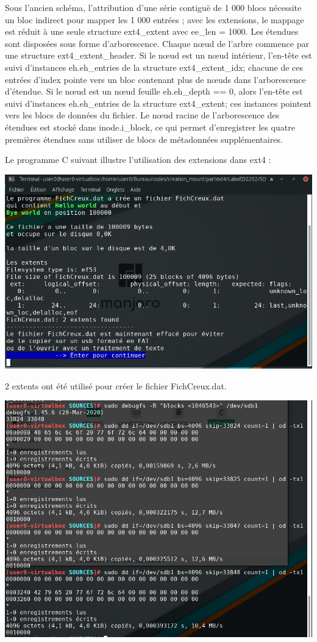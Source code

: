 \documentclass[12pt, letterpaper]{report}
\begin{document}
Sous l'ancien schéma, l'attribution d'une série contiguë de 1 000 blocs nécessite un bloc indirect pour mapper les 1 000 entrées ; avec les extensions, le mappage est réduit à une seule structure ext4\_extent avec ee\_len = 1000. Les étendues sont disposées sous forme d'arborescence. Chaque nœud de l'arbre commence par une structure ext4\_extent\_header. Si le nœud est un nœud intérieur, l'en-tête est suivi d'instances eh.eh\_entries de la structure ext4\_extent\_idx; chacune de ces entrées d'index pointe vers un bloc contenant plus de nœuds dans l'arborescence d'étendue. Si le nœud est un nœud feuille eh.eh\_depth == 0, alors l'en-tête est suivi d'instances eh.eh\_entries de la structure ext4\_extent; ces instances pointent vers les blocs de données du fichier. Le nœud racine de l'arborescence des étendues est stocké dans inode.i\_block, ce qui permet d'enregistrer les quatre premières étendues sans utiliser de blocs de métadonnées supplémentaires.

Le programme C suivant illustre l'utilisation des extensions dans ext4 :
\begin{center}
	\includegraphics[width=\textwidth]{creux}
\end{center}

2 extents ont été utilisé pour créer le fichier FichCreux.dat.

\begin{center}
	\includegraphics[width=\textwidth]{blockread}
\end{center}
\end{document}
